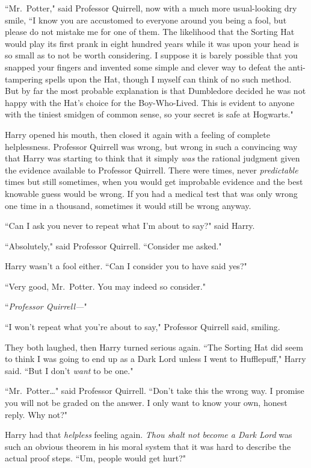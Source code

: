 ``Mr.~Potter," said Professor Quirrell, now with a much more usual-looking dry smile, ``I know you are accustomed to everyone around you being a fool, but please do not mistake me for one of them. The likelihood that the Sorting Hat would play its first prank in eight hundred years while it was upon your head is so small as to not be worth considering. I suppose it is barely possible that you snapped your fingers and invented some simple and clever way to defeat the anti-tampering spells upon the Hat, though I myself can think of no such method. But by far the most probable explanation is that Dumbledore decided he was not happy with the Hat's choice for the Boy-Who-Lived. This is evident to anyone with the tiniest smidgen of common sense, so your secret is safe at Hogwarts."

Harry opened his mouth, then closed it again with a feeling of complete helplessness. Professor Quirrell was wrong, but wrong in such a convincing way that Harry was starting to think that it simply \emph{was} the rational judgment given the evidence available to Professor Quirrell. There were times, never \emph{predictable} times but still sometimes, when you would get improbable evidence and the best knowable guess would be wrong. If you had a medical test that was only wrong one time in a thousand, sometimes it would still be wrong anyway.

``Can I ask you never to repeat what I'm about to say?" said Harry.

``Absolutely," said Professor Quirrell. ``Consider me asked."

Harry wasn't a fool either. ``Can I consider you to have said yes?"

``Very good, Mr.~Potter. You may indeed so consider."

``\emph{Professor Quirrell—}"

``I won't repeat what you're about to say," Professor Quirrell said, smiling.

They both laughed, then Harry turned serious again. ``The Sorting Hat did seem to think I was going to end up as a Dark Lord unless I went to Hufflepuff," Harry said. ``But I don't \emph{want} to be one."

``Mr.~Potter{\ldots}" said Professor Quirrell. ``Don't take this the wrong way. I promise you will not be graded on the answer. I only want to know your own, honest reply. Why not?"

Harry had that \emph{helpless} feeling again. \emph{Thou shalt not become a Dark Lord} was such an obvious theorem in his moral system that it was hard to describe the actual proof steps. ``Um, people would get hurt?"

